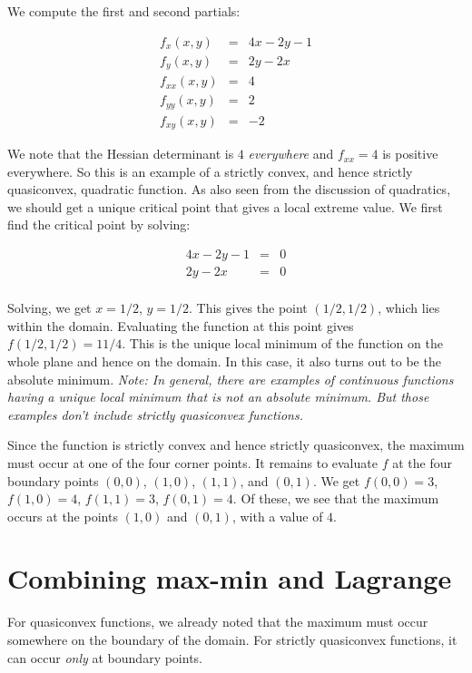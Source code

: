 \documentclass[10pt]{amsart}
\begin{document}
We compute the first and second partials:

\begin{eqnarray*}
  f_x(x,y) & = & 4x - 2y - 1 \\
  f_y(x,y) & = & 2y - 2x \\
  f_{xx}(x,y)& = & 4\\
  f_{yy}(x,y)& = & 2\\
  f_{xy}(x,y)& = & -2
\end{eqnarray*}

We note that the Hessian determinant is $4$ {\em everywhere} and
$f_{xx} = 4$ is positive everywhere. So this is an example of a
strictly convex, and hence strictly quasiconvex, quadratic
function. As also seen from the discussion of quadratics, we should
get a unique critical point that gives a local extreme value. We first
find the critical point by solving:

\begin{eqnarray*}
  4x - 2y - 1 & = & 0\\
  2y - 2x & = & 0\\
\end{eqnarray*}

Solving, we get $x = 1/2$, $y = 1/2$. This gives the point
$(1/2,1/2)$, which lies within the domain. Evaluating the function at
this point gives $f(1/2,1/2) = 11/4$. This is the unique local minimum
of the function on the whole plane and hence on the domain. In this
case, it also turns out to be the absolute minimum. {\em Note: In
general, there are examples of continuous functions having a unique
local minimum that is not an absolute minimum. But those examples
don't include strictly quasiconvex functions.}

Since the function is strictly convex and hence strictly quasiconvex,
the maximum must occur at one of the four corner points. It remains to
evaluate $f$ at the four boundary points $(0,0)$, $(1,0)$, $(1,1)$,
and $(0,1)$. We get $f(0,0) = 3$, $f(1,0) = 4$, $f(1,1) = 3$, $f(0,1)
= 4$. Of these, we see that the maximum occurs at the points $(1,0)$
and $(0,1)$, with a value of $4$.

\section{Combining max-min and Lagrange}

For quasiconvex functions, we already noted that the maximum must
occur somewhere on the boundary of the domain. For strictly
quasiconvex functions, it can occur {\em only} at boundary points.
\end{document}
